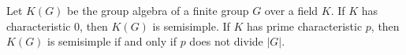 Let $K(G)$ be the group algebra of a finite group $G$ over a field $K$. If $K$ has characteristic $0$, then $K(G)$ is semisimple. If $K$ has prime characteristic $p$, then $K(G)$ is semisimple if and only if $p$ does not divide $|G|$.
